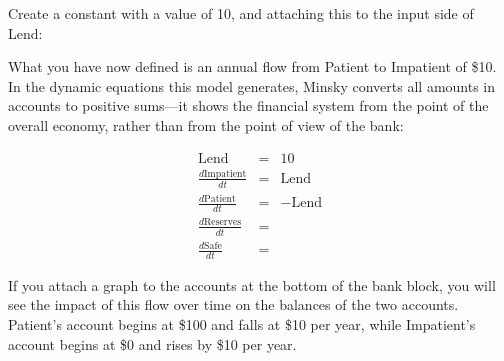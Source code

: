 Create a constant with a value of 10, and attaching this to the input
side of Lend:

\begin{center}
\end{center}

What you have now defined is an annual flow from Patient to Impatient
of \$10. In the dynamic equations this model generates, Minsky
converts all amounts in accounts to positive sums---it shows the
financial system from the point of the overall economy, rather than
from the point of view of the bank:

\begin{eqnarray*}
\mathrm{Lend}&=&10\\
\frac{d\mathrm{Impatient}}{dt}&=&\mathrm{Lend}\\
\frac{d\mathrm{Patient}}{dt}&=&-\mathrm{Lend}\\
\frac{d\mathrm{Reserves}}{dt}&=&\\
\frac{d\mathrm{Safe}}{dt}&=&
\end{eqnarray*}



If you attach a graph to the accounts at the bottom of the bank block,
you will see the impact of this flow over time on the balances of the
two accounts. Patient's account begins at \$100 and falls at \$10 per
year, while Impatient's account begins at \$0 and rises by \$10 per
year.

